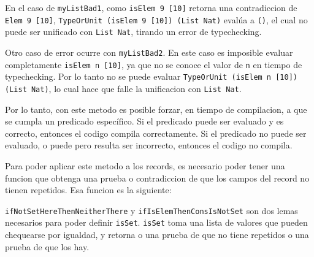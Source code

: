 En el caso de \texttt{myListBad1}, como \texttt{isElem 9 [10]} retorna una contradiccion de \texttt{Elem 9 [10]}, \texttt{TypeOrUnit (isElem 9 [10]) (List Nat)} evalúa a \texttt{()}, el cual no puede ser unificado con \texttt{List Nat}, tirando un error de typechecking.

Otro caso de error ocurre con \texttt{myListBad2}. En este caso es imposible evaluar completamente \texttt{isElem n [10]}, ya que no se conoce el valor de \texttt{n} en tiempo de typechecking. Por lo tanto no se puede evaluar \texttt{TypeOrUnit (isElem n [10]) (List Nat)}, lo cual hace que falle la unificacion con \texttt{List Nat}.

Por lo tanto, con este metodo es posible forzar, en tiempo de compilacion, a que se cumpla un predicado específico. Si el predicado puede ser evaluado y es correcto, entonces el codigo compila correctamente. Si el predicado no puede ser evaluado, o puede pero resulta ser incorrecto, entonces el codigo no compila.

Para poder aplicar este metodo a los records, es necesario poder tener una funcion que obtenga una prueba o contradiccion de que los campos del record no tienen repetidos. Esa funcion es la siguiente:


\texttt{ifNotSetHereThenNeitherThere} y \texttt{ifIsElemThenConsIsNotSet} son dos lemas necesarios para poder definir \texttt{isSet}. \texttt{isSet} toma una lista de valores que pueden chequearse por igualdad, y retorna o una prueba de que no tiene repetidos o una prueba de que los hay.

